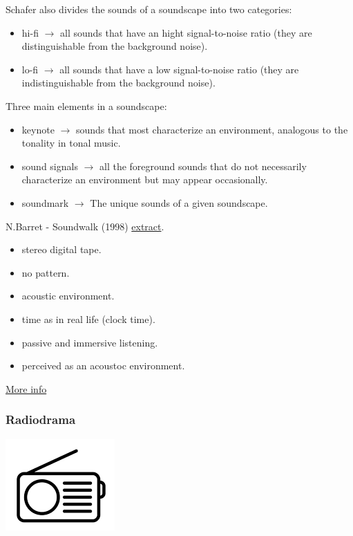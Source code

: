 Schafer also divides the sounds of a soundscape into two categories:

\begin{itemize}
\tightlist
\item hi-fi \(\rightarrow\) all sounds that have an hight signal-to-noise ratio (they are distinguishable from the background noise).
\item lo-fi \(\rightarrow\) all sounds that have a low signal-to-noise ratio (they are indistinguishable from the background noise).
\end{itemize}

Three main elements in a soundscape:

\begin{itemize}
\tightlist
\item keynote \(\rightarrow\) sounds that most characterize an environment, analogous to the tonality in tonal music.
\item sound signals \(\rightarrow\) all the foreground sounds that do not necessarily characterize an environment but may appear occasionally.
\item soundmark \(\rightarrow\) The unique sounds of a given soundscape.
\end{itemize}

N.Barret - Soundwalk (1998) \href{https://github.com/musicaecodice/EMC/blob/main/2_instruments/suoni/soundwalk.mp3}{extract}.

\begin{itemize}
\tightlist
\item stereo digital tape. 
\item no pattern. 
\item acoustic environment. 
\item time as in real life (clock time). 
\item passive and immersive listening. 
\item perceived as an acoustoc environment.
\end{itemize}

\href{img/schafer.pdf}{More info}

\subsubsection{Radiodrama }\label{radiodrama}

\begin{center}
\includegraphics[scale=0.5]{../img/radio.png}
\end{center}

